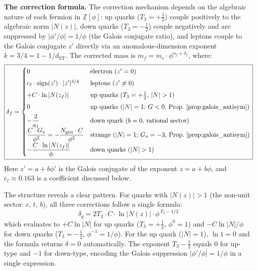 \documentclass[12pt,a4paper]{article}
\theoremstyle{definition}
\begin{document}
\textbf{The correction formula.}  The correction mechanism depends on the algebraic nature of each fermion in $\mathbb{Z}[\phi]$: up quarks ($T_3 = +\tfrac{1}{2}$) couple positively to the algebraic norm $|N(z)|$, down quarks ($T_3 = -\tfrac{1}{2}$) couple negatively and are suppressed by $|\phi'/\phi| = 1/\phi$ (the Galois conjugate ratio), and leptons couple to the Galois conjugate $z'$ directly via an anomalous-dimension exponent $k = 3/4 = 1 - 1/d_{\text{ST}}$.  The corrected mass is $m_f = m_e \cdot \phi^{n_f + \delta_f}$, where:
\begin{equation}
\boxed{\delta_f = \begin{cases}
0 & \text{electron (}z' = 0\text{)} \\[4pt]
c_\ell \cdot \mathrm{sign}(z') \cdot |z'|^{3/4} & \text{leptons (}z' \neq 0\text{)} \\[4pt]
+C \cdot \ln|N(z_f)| & \text{up quarks (}T_3 = +\tfrac{1}{2}\text{, } |N| > 1\text{)} \\[4pt]
0 & \text{up quarks (}|N| = 1\text{; }G < 0\text{, Prop.~\ref{prop:galois_antisym})} \\[4pt]
-\dfrac{2}{a_1} & \text{down quark (}b = 0\text{, rational sector)} \\[4pt]
\dfrac{C \cdot G_s}{\phi^2} = -\dfrac{N_{\text{gen}} \cdot C}{\phi^2} & \text{strange (}|N| = 1\text{; }G_s = -3\text{, Prop.~\ref{prop:galois_antisym})} \\[4pt]
-\dfrac{C \cdot \ln|N(z_f)|}{\phi} & \text{down quarks (}|N| > 1\text{)}
\end{cases}}
\label{eq:normlog}
\end{equation}
Here $z' = a + b\phi'$ is the Galois conjugate of the exponent $z = a + b\phi$, and $c_\ell \approx 0.163$ is a coefficient discussed below.

The structure reveals a clear pattern.  For quarks with $|N(z)| > 1$ (the non-unit sector: $c$, $t$, $b$), all three corrections follow a single formula:
\begin{equation}
\boxed{\delta_q = 2T_3 \cdot C \cdot \ln|N(z)| \cdot \phi^{\,T_3 - 1/2}}
\label{eq:unified_quark}
\end{equation}
which evaluates to $+C\ln|N|$ for up quarks ($T_3 = +\tfrac{1}{2}$, $\phi^0 = 1$) and $-C\ln|N|/\phi$ for down quarks ($T_3 = -\tfrac{1}{2}$, $\phi^{-1} = 1/\phi$).  For the up quark ($|N| = 1$), $\ln 1 = 0$ and the formula returns $\delta = 0$ automatically.  The exponent $T_3 - \tfrac{1}{2}$ equals $0$ for up-type and $-1$ for down-type, encoding the Galois suppression $|\phi'/\phi| = 1/\phi$ in a single expression.
\end{document}
